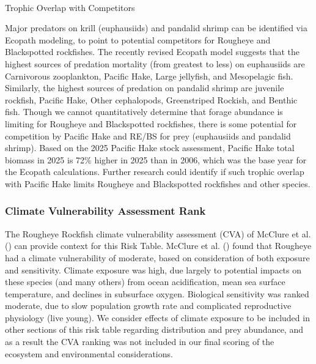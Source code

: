 \documentclass[
]{scrartcl}
\makeatletter
\let\oldparagraph\paragraph
\renewcommand{\paragraph}{
    \@ifstar
      \xxxParagraphStar
      \xxxParagraphNoStar
  }
\newcommand{\xxxParagraphStar}[1]{\oldparagraph*{#1}\mbox{}}
\newcommand{\xxxParagraphNoStar}[1]{\oldparagraph{#1}\mbox{}}
\makeatother
\begin{document}
\paragraph{Trophic Overlap with
Competitors}\label{trophic-overlap-with-competitors}

Major predators on krill (euphausiids) and pandalid shrimp can be
identified via Ecopath modeling, to point to potential competitors for
Rougheye and Blackspotted rockfishes. The recently revised Ecopath model
suggests that the highest sources of predation mortality (from greatest
to less) on euphausiids are Carnivorous zooplankton, Pacific Hake, Large
jellyfish, and Mesopelagic fish. Similarly, the highest sources of
predation on pandalid shrimp are juvenile rockfish, Pacific Hake, Other
cephalopods, Greenstriped Rockish, and Benthic fish. Though we cannot
quantitatively determine that forage abundance is limiting for Rougheye
and Blackspotted rockfishes, there is some potential for competition by
Pacific Hake and RE/BS for prey (euphausiids and pandalid shrimp). Based
on the 2025 Pacific Hake stock assessment, Pacific Hake total biomass in
2025 is 72\% higher in 2025 than in 2006, which was the base year for
the Ecopath calculations. Further research could identify if such
trophic overlap with Pacific Hake limits Rougheye and Blackspotted
rockfishes and other species.

\subsubsection{Climate Vulnerability Assessment
Rank}\label{climate-vulnerability-assessment-rank}

The Rougheye Rockfish climate vulnerability assessment (CVA) of McClure
et al. () can provide context for this
Risk Table. McClure et al. () found that
Rougheye had a climate vulnerability of moderate, based on consideration
of both exposure and sensitivity. Climate exposure was high, due largely
to potential impacts on these species (and many others) from ocean
acidification, mean sea surface temperature, and declines in subsurface
oxygen. Biological sensitivity was ranked moderate, due to slow
population growth rate and complicated reproductive physiology (live
young). We consider effects of climate exposure to be included in other
sections of this risk table regarding distribution and prey abundance,
and as a result the CVA ranking was not included in our final scoring of
the ecosystem and environmental considerations.
\end{document}
